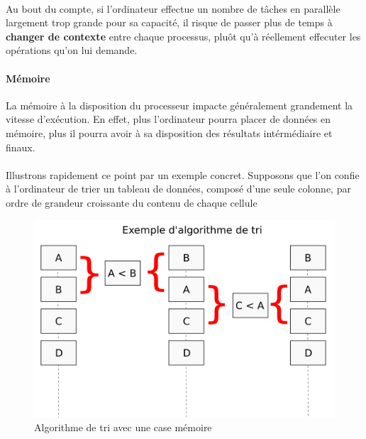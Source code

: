 {  \paragraph{} Au bout du compte, si l'ordinateur effectue un nombre de tâches en parallèle
  largement trop grande pour sa capacité, il risque de passer plus de temps à \textbf{changer de
  contexte} entre chaque processus, pluôt qu'à réellement effecuter les opérations qu'on lui
  demande.

  \paragraph{Mémoire} La mémoire à la disposition du processeur impacte généralement grandement la
  vitesse d'exécution. En effet, plus l'ordinateur pourra placer de données en mémoire, plus il
  pourra avoir à sa disposition des résultats intérmédiaire et finaux.

  \paragraph{} Illustrons rapidement ce point par un exemple concret. Supposons que l'on confie à
  l'ordinateur de trier un tableau de données, composé d'une seule colonne, par ordre de grandeur
  croissante du contenu de chaque cellule

  \begin{figure}[h]
    \begin{center}
      \includegraphics[scale=0.3]{img/exemple-algo.png}
      \caption{Algorithme de tri avec une case mémoire}
      \label{algo-exemple}
    \end{center}
  \end{figure}

}

